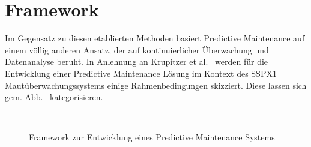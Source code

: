 \chapter{Framework}\label{ch:framework}
Im Gegensatz zu diesen etablierten Methoden basiert Predictive Maintenance auf einem völlig anderen Ansatz, der auf kontinuierlicher
Überwachung und Datenanalyse beruht. In Anlehnung an Krupitzer et al.~\cite{Krupitzer2020} werden für die Entwicklung einer Predictive
Maintenance Lösung im Kontext des SSPX1 Mautüberwachungssystems einige Rahmenbedingungen skizziert. Diese lassen sich gem.
\hyperref[fig:pdm_framework]{Abb.~} kategorisieren.

\begin{figure}[H]
    \centering
    \caption{Framework zur Entwicklung eines Predictive Maintenance Systems}
~\label{fig:pdm_framework}
\end{figure}

